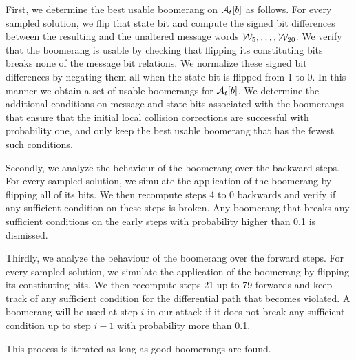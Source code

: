 First, we determine the best usable boomerang on $\mathcal{A}_t[b]$ as follows.
For every sampled solution, we flip that state bit and compute the signed bit differences between the resulting and the unaltered message words $\mathcal{W}_5,\ldots,\mathcal{W}_{20}$.
We verify that the boomerang is usable by checking that flipping its constituting bits breaks none of the message bit relations.
We normalize these signed bit differences by negating them all when the state bit is flipped from 1 to 0.
In this manner we obtain a set of usable boomerangs for $\mathcal{A}_t[b]$.
We determine the additional conditions on message and state bits associated with the boomerangs that ensure that the initial local collision corrections are successful with probability one,
and only keep the best usable boomerang that has the fewest such conditions.

Secondly, we analyze the behaviour of the boomerang over the backward steps.
For every sampled solution, we simulate the application of the boomerang by flipping all of its bits.
We then recompute steps 4 to 0 backwards and verify if any sufficient condition on these steps is broken.
Any boomerang that breaks any sufficient conditions on the early steps with probability higher than 0.1 is dismissed.

Thirdly, we analyze the behaviour of the boomerang over the forward steps.
For every sampled solution, we simulate the application of the boomerang by flipping its constituting bits.
We then recompute steps 21 up to 79 forwards and keep track of any sufficient condition for the differential path that becomes violated.
A boomerang will be used at step $i$ in our attack if it does not break any sufficient condition up to step $i-1$ with probability more than 0.1.

This process is iterated as long as good boomerangs are found.

